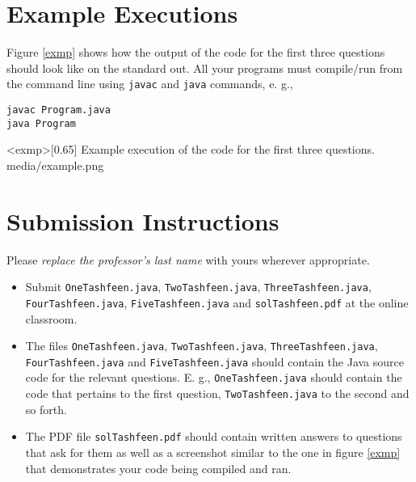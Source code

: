 \documentclass{homework}
\begin{document}
\section{Example Executions}

Figure \ref{exmp} shows how the output of the code for the first three
questions should look like on the standard out. All your programs must
compile/run from the command line using \texttt{javac} and
\texttt{java} commands, e. g.,

\begin{verbatim}
javac Program.java
java Program
\end{verbatim}

\img<exmp>[0.65]
{Example execution of the code for the first three questions.}
{media/example.png}

\section{Submission Instructions}

Please \textit{replace the professor's last name} with yours wherever appropriate.

\begin{itemize}
  \item Submit \texttt{OneTashfeen.java},
        \texttt{TwoTashfeen.java}, \texttt{ThreeTashfeen.java},
        \texttt{FourTashfeen.java}, \texttt{FiveTashfeen.java} and
        \texttt{solTashfeen.pdf} at the online classroom.

  \item The files \texttt{OneTashfeen.java},
        \texttt{TwoTashfeen.java}, \texttt{ThreeTashfeen.java},
        \texttt{FourTashfeen.java} and \texttt{FiveTashfeen.java} should
        contain the Java source code for the relevant questions. E. g.,
        \texttt{OneTashfeen.java} should contain the code that pertains to
        the first question, \texttt{TwoTashfeen.java} to the second and so
        forth.

  \item The PDF file \texttt{solTashfeen.pdf} should contain
        written answers to questions that ask for them as well as a
        screenshot similar to the one in figure \ref{exmp} that
        demonstrates your code being compiled and ran.
\end{itemize}
\end{document}

